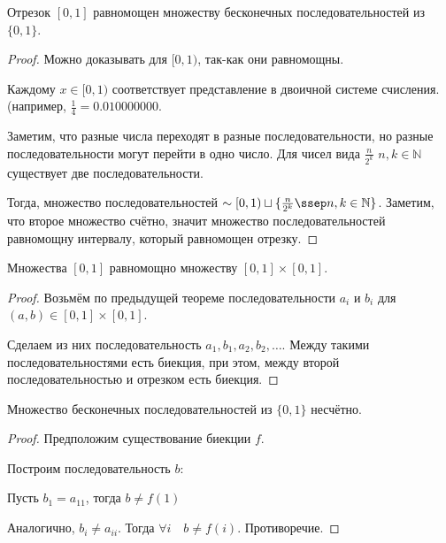 \begin{theorem} \thmslashn

    Отрезок $[0, 1]$ равномощен множеству бесконечных последовательностей из $\{0, 1\} $.
    \begin{proof} \thmslashn
   
        Можно доказывать для $[0, 1)$, так-как они равномощны.

        Каждому $x\in [0, 1)$ соответствует представление в двоичной системе счисления. (например, $\frac{1}{4} = 0.010000000$.

        Заметим, что разные числа переходят в разные последовательности, но разные последовательности могут перейти в одно число. Для чисел вида $\frac{n}{2^{k}}$  $n, k \in \mathbb{N}$ существует две последовательности. 

        Тогда, множество последовательностей $\sim [0, 1) \sqcup \{\frac{n}{2^{k}}\ssep n, k\in \mathbb{N}\}$. Заметим, что второе множество счётно, значит множество последовательностей равномощну интервалу, который равномощен отрезку.
    \end{proof}
\end{theorem}
\begin{theorem} \thmslashn

    Множества $[0, 1]$ равномощно множеству $[0, 1] \times [0, 1]$.

    \begin{proof} \thmslashn
    
        Возьмём по предыдущей теореме последовательности $a_{i}$ и $b_{i}$ для $(a, b)\in [0, 1] \times [0, 1]$.

        Сделаем из них последовательность $a_1, b_1, a_2, b_{2}, \ldots$. Между такими последовательностями есть биекция, при этом, между второй последовательностью и отрезком есть биекция.
    \end{proof}
\end{theorem}
\begin{theorem} \thmslashn

    Множество бесконечных последовательностей из $\{0, 1\} $ несчётно.
    \begin{proof} \thmslashn
    
        Предположим существование биекции $f$.

        Построим последовательность $b$:
        
        Пусть $b_{1} = a_{11}$, тогда $b \neq f(1)$

        Аналогично, $b_{i} \neq a_{ii}$. Тогда $\forall{i}\quad b \neq f(i)$. Противоречие.
    \end{proof}
\end{theorem}

